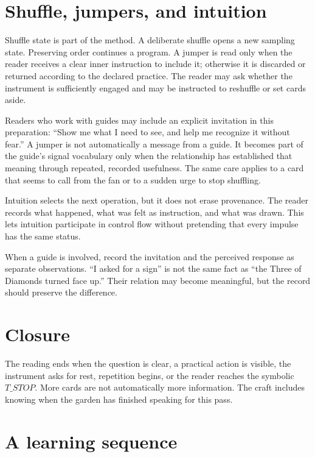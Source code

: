 \section{Shuffle, jumpers, and intuition}

Shuffle state is part of the method. A deliberate shuffle opens a new sampling
state. Preserving order continues a program. A jumper is read only when the
reader receives a clear inner instruction to include it; otherwise it is
discarded or returned according to the declared practice. The reader may ask
whether the instrument is sufficiently engaged and may be instructed to
reshuffle or set cards aside.

Readers who work with guides may include an explicit invitation in this
preparation: ``Show me what I need to see, and help me recognize it without
fear.'' A jumper is not automatically a message from a guide. It becomes part
of the guide's signal vocabulary only when the relationship has established
that meaning through repeated, recorded usefulness. The same care applies to a
card that seems to call from the fan or to a sudden urge to stop shuffling.

Intuition selects the next operation, but it does not erase provenance. The
reader records what happened, what was felt as instruction, and what was drawn.
This lets intuition participate in control flow without pretending that every
impulse has the same status.

When a guide is involved, record the invitation and the perceived response as
separate observations. ``I asked for a sign'' is not the same fact as ``the
Three of Diamonds turned face up.'' Their relation may become meaningful, but
the record should preserve the difference.

\section{Closure}

The reading ends when the question is clear, a practical action is visible,
the instrument asks for rest, repetition begins, or the reader reaches the
symbolic $T\_STOP$. More cards are not automatically more information. The
craft includes knowing when the garden has finished speaking for this pass.

\section{A learning sequence}

